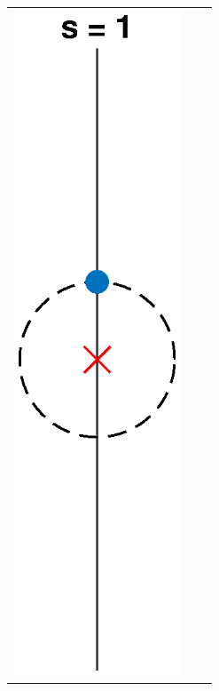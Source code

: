 \documentclass[thesis.tex]{subfiles}
\begin{document}
\begin{figure}[H]
\begin{center}
\begin{tabular}{ccc}
\includegraphics[width=5cm]{images/kreinbubbles/bubbleR} \\

\end{tabular}
\end{center}
\end{figure}
\end{document}
